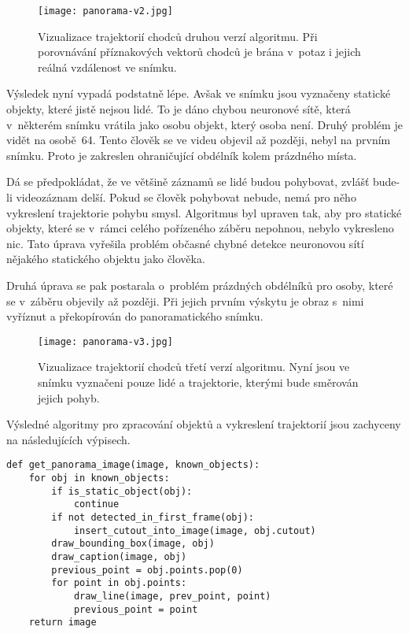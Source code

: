 \begin{figure}[H]
    \centering
    \texttt{[image: panorama-v2.jpg]}
    \caption[Druhá verze algoritmu identifikace chodců]{Vizualizace trajektorií chodců druhou verzí algoritmu. Při porovnávání příznakových vektorů chodců je brána v~potaz i jejich reálná vzdálenost ve snímku.}
    \label{fig_panorama-v2}
\end{figure}

Výsledek nyní vypadá podstatně lépe. Avšak ve snímku jsou vyznačeny statické objekty, které jistě nejsou lidé. To je dáno chybou neuronové sítě, která v~některém snímku vrátila jako osobu objekt, který osoba není. Druhý problém je vidět na osobě~64. Tento člověk se ve videu objevil až později, nebyl na prvním snímku. Proto je zakreslen ohraničující obdélník kolem prázdného místa.

Dá se předpokládat, že ve většině záznamů se lidé budou pohybovat, zvlášť bude-li videozáznam delší. Pokud se člověk pohybovat nebude, nemá pro něho vykreslení trajektorie pohybu smysl. Algoritmus byl upraven tak, aby pro statické objekty, které se v~rámci celého pořízeného záběru nepohnou, nebylo vykresleno nic. Tato úprava vyřešila problém občasné chybné detekce neuronovou sítí nějakého statického objektu jako člověka.

Druhá úprava se pak postarala o~problém prázdných obdélníků pro osoby, které se v~záběru objevily až později. Při jejich prvním výskytu je obraz s~nimi vyříznut a překopírován do panoramatického snímku.

\begin{figure}[H]
    \centering
    \texttt{[image: panorama-v3.jpg]}
    \caption[Třetí verze algoritmu identifikace chodců]{Vizualizace trajektorií chodců třetí verzí algoritmu. Nyní jsou ve snímku vyznačeni pouze lidé a trajektorie, kterými bude směrován jejich pohyb.}
    \label{fig_panorama-v3}
\end{figure}

Výsledné algoritmy pro zpracování objektů a vykreslení trajektorií jsou zachyceny na následujících výpisech.

\begin{minipage}{\linewidth}
    \bigskip
    \begin{lstlisting}
def get_panorama_image(image, known_objects):
    for obj in known_objects:
        if is_static_object(obj):
            continue
        if not detected_in_first_frame(obj):
            insert_cutout_into_image(image, obj.cutout)
        draw_bounding_box(image, obj)
        draw_caption(image, obj)
        previous_point = obj.points.pop(0)
        for point in obj.points:
            draw_line(image, prev_point, point)
            previous_point = point
    return image
    \end{lstlisting}
\end{minipage}


